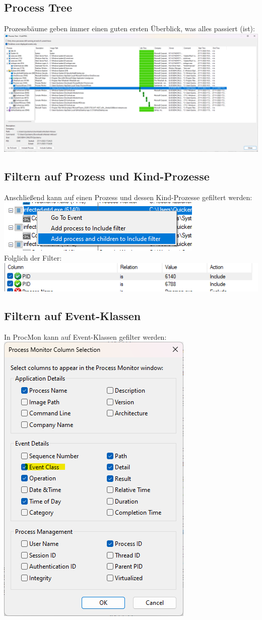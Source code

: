 \documentclass{article}
\begin{document}
	\subsection*{Process Tree}
	Prozessbäume geben immer einen guten ersten Überblick, was alles passiert (ist):\\
	\includegraphics[width=0.7\linewidth]{"pictures/1.4 process tree"}
	\subsection*{Filtern auf Prozess und Kind-Prozesse}
	Anschließend kann auf einen Prozess und dessen Kind-Prozesse gefiltert werden:\\
	\includegraphics[width=0.5\linewidth]{"pictures/1.5 process tree2"}\\
	Folglich der Filter:\\
	\includegraphics[width=0.5\linewidth]{"pictures/1.6 process tree3"}
	
	\pagebreak
	
	\subsection*{Filtern auf Event-Klassen}
	In ProcMon kann auf Event-Klassen gefilter werden:\\
	\includegraphics[width=0.4\linewidth]{"pictures/1.7 event class"}\\
	
\end{document}
